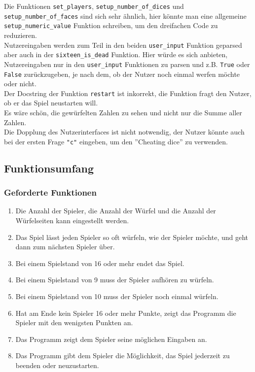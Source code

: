 Die Funktionen \verb+set_players+, \verb+setup_number_of_dices+ und \verb+setup_number_of_faces+ sind sich sehr ähnlich, hier könnte man eine allgemeine \verb+setup_numeric_value+ Funktion schreiben, um den dreifachen Code zu reduzieren.\\

Nutzereingaben werden zum Teil in den beiden \verb+user_input+ Funktion geparsed aber auch in der \verb+sixteen_is_dead+ Funktion. Hier würde es sich anbieten, Nutzereingaben nur in den \verb+user_input+ Funktionen zu parsen und z.B. \verb+True+ oder \verb+False+ zurückzugeben, je nach dem, ob der Nutzer noch einmal werfen möchte oder nicht.\\

Der Docstring der Funktion \verb+restart+ ist inkorrekt, die Funktion fragt den Nutzer, ob er das Spiel neustarten will.\\

Es wäre schön, die gewürfelten Zahlen zu sehen und nicht nur die Summe aller Zahlen.\\

Die Dopplung des Nutzerinterfaces ist nicht notwendig, der Nutzer könnte auch bei der ersten Frage \verb+"c"+ eingeben, um den ''Cheating dice'' zu verwenden.\\

\subsection*{Funktionsumfang}

\subsubsection*{Geforderte Funktionen}

\begin{enumerate}
\item Die Anzahl der Spieler, die Anzahl der Würfel und die Anzahl der Würfelseiten kann eingestellt werden.
\item Das Spiel lässt jeden Spieler so oft würfeln, wie der Spieler möchte, und geht dann zum nächsten Spieler über.
\item Bei einem Spielstand von 16 oder mehr endet das Spiel.
\item Bei einem Spielstand von 9 muss der Spieler aufhören zu würfeln.
\item Bei einem Spielstand von 10 muss der Spieler noch einmal würfeln.
\item Hat am Ende kein Spieler 16 oder mehr Punkte, zeigt das Programm die Spieler mit den wenigsten Punkten an.
\item Das Programm zeigt dem Spieler seine möglichen Eingaben an.
\item Das Programm gibt dem Spieler die Möglichkeit, das Spiel jederzeit zu beenden oder neuzustarten.
\end{enumerate}

